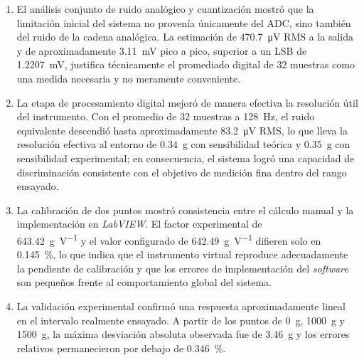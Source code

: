 \begin{enumerate}
    \item El análisis conjunto de ruido analógico y cuantización mostró que la limitación inicial del sistema no provenía únicamente del ADC, sino también del ruido de la cadena analógica. La estimación de \SI{470.7}{\micro\V} RMS a la salida y de aproximadamente \SI{3.11}{\milli\V} pico a pico, superior a un LSB de \SI{1.2207}{\milli\V}, justifica técnicamente el promediado digital de 32 muestras como una medida necesaria y no meramente conveniente.

    \item La etapa de procesamiento digital mejoró de manera efectiva la resolución útil del instrumento. Con el promedio de 32 muestras a \SI{128}{\Hz}, el ruido equivalente descendió hasta aproximadamente \SI{83.2}{\micro\V} RMS, lo que lleva la resolución efectiva al entorno de \SI{0.34}{\g} con sensibilidad teórica y \SI{0.35}{\g} con sensibilidad experimental; en consecuencia, el sistema logró una capacidad de discriminación consistente con el objetivo de medición fina dentro del rango ensayado.

    \item La calibración de dos puntos mostró consistencia entre el cálculo manual y la implementación en \textit{LabVIEW}. El factor experimental de \\ \SI{643.42}{\g\per\V} y el valor configurado de  \SI{642.49}{\g\per\V} difieren solo en \SI{0.145}{\percent}, lo que indica que el instrumento virtual reproduce adecuadamente la pendiente de calibración y que los errores de implementación del \textit{software} son pequeños frente al comportamiento global del sistema.

    \item La validación experimental confirmó una respuesta aproximadamente lineal en el intervalo realmente ensayado. A partir de los puntos de \SI{0}{\g}, \SI{1000}{\g} y \SI{1500}{\g}, la máxima desviación absoluta observada fue de \SI{3.46}{\g} y los errores relativos permanecieron por debajo de \SI{0.346}{\percent}.


\end{enumerate}
